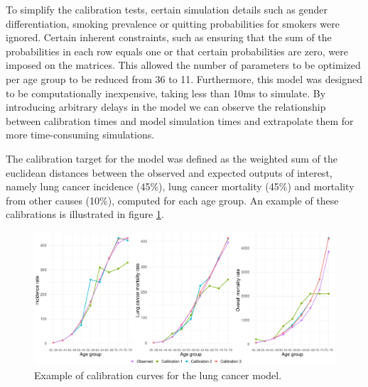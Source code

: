 \documentclass{IOS-Book-Article}
\begin{document}

To simplify the calibration tests, certain simulation details such as gender differentiation, smoking prevalence or quitting probabilities for smokers were ignored. Certain inherent constraints, such as ensuring that the sum of the probabilities in each row equals one or that certain probabilities are zero, were imposed on the matrices. This allowed the number of parameters to be optimized per age group to be reduced from 36 to 11. Furthermore, this model was designed to be computationally inexpensive, taking less than 10ms to simulate. By introducing arbitrary delays in the model we can observe the relationship between calibration times and model simulation times and extrapolate them for more time-consuming simulations.
	

	
The calibration target for the model was defined as the weighted sum of the euclidean distances between the observed and expected outputs of interest, namely lung cancer incidence (45\%), lung cancer mortality (45\%) and mortality from other causes (10\%), computed for each age group.	An example of these calibrations is illustrated in figure \ref{fig:calibration-curve}.
	
\begin{figure}[h!]
	\centering	
	\includegraphics[width=\textwidth]{figs/calibration-curves.pdf}		
	\caption{Example of calibration curves for the lung cancer model.}	
	\label{fig:calibration-curve}	
\end{figure}
\end{document}
